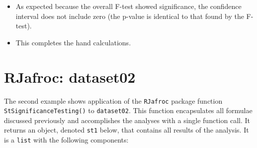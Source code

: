 \documentclass[
]{book}
\providecommand{\tightlist}{%
  \setlength{\itemsep}{0pt}\setlength{\parskip}{0pt}}
\begin{document}
\begin{itemize}
\tightlist
\item
  As expected because the overall F-test showed significance, the confidence interval does not include zero (the p-value is identical to that found by the F-test).
\item
  This completes the hand calculations.
\end{itemize}

\hypertarget{ORApplications-dataset02-RJafroc}{%
\section{RJafroc: dataset02}\label{ORApplications-dataset02-RJafroc}}

The second example shows application of the \texttt{RJafroc} package function \texttt{StSignificanceTesting()} to \texttt{dataset02}. This function encapsulates all formulae discussed previously and accomplishes the analyses with a single function call. It returns an object, denoted \texttt{st1} below, that contains all results of the analysis. It is a \texttt{list} with the following components:
\end{document}
